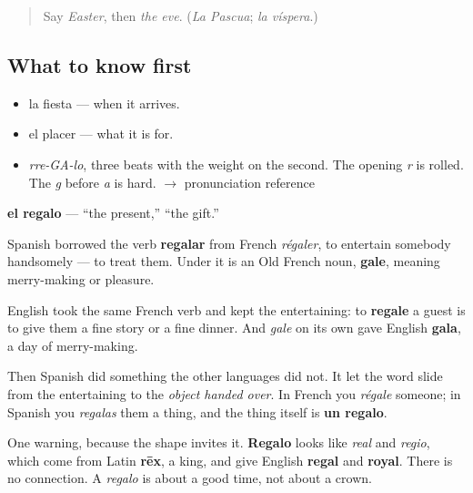 \label{lesson:ES-C357-regalo}



\begin{quote}
Say \emph{Easter}, then \emph{the eve}. (\emph{La Pascua}; \emph{la víspera}.)
\end{quote}

\subsection*{What to know first}
\begin{itemize}
\raggedright
  \item la fiesta — when it arrives.
  \item el placer — what it is for.
\end{itemize}

\begin{sounds}
\begin{itemize}
\raggedright
  \item \emph{rre-GA-lo}, three beats with the weight on the second. The opening \emph{r} is rolled. The \emph{g} before \emph{a} is hard. $\to$ pronunciation reference
\end{itemize}
\end{sounds}

\begin{cousinweb}
\textbf{el regalo} — \textquotedblleft{}the present,\textquotedblright{} \textquotedblleft{}the gift.\textquotedblright{}

Spanish borrowed the verb \textbf{regalar} from French \emph{régaler}, to entertain somebody handsomely — to treat them. Under it is an Old French noun, \textbf{gale}, meaning merry-making or pleasure.

English took the same French verb and kept the entertaining: to \textbf{regale} a guest is to give them a fine story or a fine dinner. And \emph{gale} on its own gave English \textbf{gala}, a day of merry-making.

Then Spanish did something the other languages did not. It let the word slide from the entertaining to the \emph{object handed over}. In French you \emph{régale} someone; in Spanish you \emph{regalas} them a thing, and the thing itself is \textbf{un regalo}.

One warning, because the shape invites it. \textbf{Regalo} looks like \emph{real} and \emph{regio}, which come from Latin \textbf{rēx}, a king, and give English \textbf{regal} and \textbf{royal}. There is no connection. A \emph{regalo} is about a good time, not about a crown.
\end{cousinweb}

